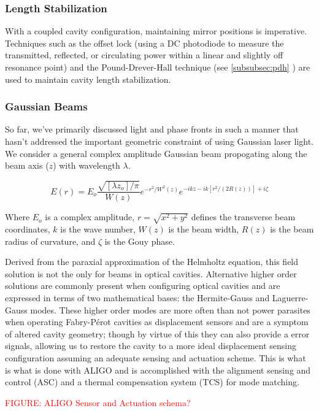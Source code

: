 \subsubsection{Length Stabilization}
With a coupled cavity configuration, maintaining mirror positions is imperative. Techniques such as the offset lock (using a DC photodiode to measure the transmitted, reflected, or circulating power within a linear and slightly off resonance point) \cite{} and the Pound-Drever-Hall technique (see \ref{subsubsec:pdh} ) are used to maintain cavity length stabilization.

\subsubsection{Gaussian Beams}
So far, we've primarily discussed light and phase fronts in such a manner that hasn't addressed the important geometric constraint of using Gaussian laser light. We consider a general complex amplitude Gaussian beam propogating along the beam axis ($z$) with wavelength $\lambda$.

\begin{equation}\label{eq:gaussian_beam}
E(r) = E_o \frac{\sqrt{[\lambda z_o] / \pi}}{W(z)}e^{-r^2 / W^2(z)} e^{-ikz - ik[r^2 / (2R(z))] + i \zeta}
\end{equation}

Where $E_o$ is a complex amplitude, $r = \sqrt{x^2 + y^2}$ defines the transverse beam coordinates, $k$ is the wave number, $W(z)$ is the beam width, $R(z)$ is the beam radius of curvature, and $\zeta$ is the Gouy phase.

Derived from the paraxial approximation of the Helmholtz equation, this field solution is not the only for beams in optical cavities. Alternative higher order solutions are commonly present when configuring optical cavities and are expressed in terms of two mathematical bases: the Hermite-Gauss and Laguerre-Gauss modes. These higher order modes are more often than not power parasites when operating Fabry-P\'{e}rot cavities as displacement sensors and are a symptom of altered cavity geometry; though by virtue of this they can also provide a error signals, allowing us to restore the cavity to a more ideal displacement sensing configuration assuming an adequate sensing and actuation scheme. This is what is what is done with ALIGO and is accomplished with the alignment sensing and control (ASC) and a thermal compensation system (TCS) for mode matching.

\textcolor{red}{FIGURE: ALIGO Sensor and Actuation schema?}


